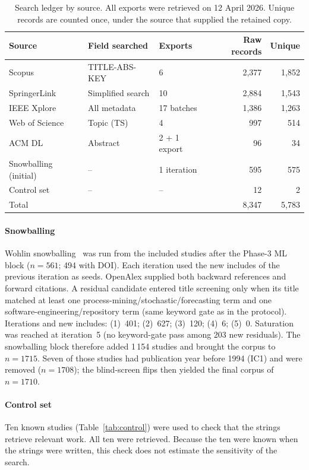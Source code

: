 \documentclass[preprint,12pt,authoryear=false]{elsarticle}
\begin{document}
\begin{table}[t]
\centering\small
\caption{Search ledger by source. All exports were retrieved on 12 April 2026. Unique records are counted once, under the source that supplied the retained copy.}\label{tab:search}
\begin{tabular}{lllrr}
\toprule
Source & Field searched & Exports & Raw records & Unique \\
\midrule
Scopus & TITLE-ABS-KEY & 6 & 2,377 & 1,852 \\
SpringerLink & Simplified search & 10 & 2,884 & 1,543 \\
IEEE Xplore & All metadata & 17 batches & 1,386 & 1,263 \\
Web of Science & Topic (TS) & 4 & 997 & 514 \\
ACM DL & Abstract & 2 + 1 export & 96 & 34 \\
Snowballing (initial) & -- & 1 iteration & 595 & 575 \\
Control set & -- & -- & 12 & 2 \\
\midrule
Total & & & 8,347 & 5,783 \\
\bottomrule
\end{tabular}
\end{table}

\paragraph{Snowballing}
Wohlin snowballing~\cite{wohlin2014} was run from the included studies after the Phase-3 ML block ($n = 561$; 494 with DOI). Each iteration used the new includes of the previous iteration as seeds. OpenAlex supplied both backward references and forward citations. A residual candidate entered title screening only when its title matched at least one process-mining/stochastic/forecasting term and one software-engineering/repository term (same keyword gate as in the protocol). Iterations and new includes: (1)~401; (2)~627; (3)~120; (4)~6; (5)~0. Saturation was reached at iteration~5 (no keyword-gate pass among 203 new residuals). The snowballing block therefore added 1\,154 studies and brought the corpus to $n = 1715$. Seven of those studies had publication year before 1994 (IC1) and were removed ($n = 1708$); the blind-screen flips then yielded the final corpus of $n = 1710$.

\paragraph{Control set}
Ten known studies (Table~\ref{tab:control}) were used to check that the strings retrieve relevant work. All ten were retrieved. Because the ten were known when the strings were written, this check does not estimate the sensitivity of the search.
\end{document}
